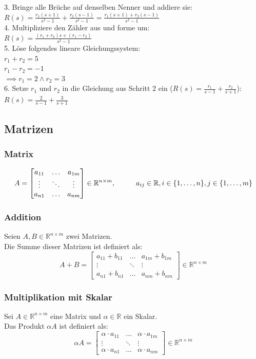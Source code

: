 \documentclass[10pt,a4paper]{article}
\newcommand{\tab}[1][1]{\hspace*{#1cm}}
\begin{document}
3. Bringe alle Brüche auf denselben Nenner und addiere sie: \\
$R(s) = \frac{r_1(s + 1)}{s^2-1} + \frac{r_2(s - 1)}{s^2-1} = \frac{r_1(s + 1) + r_2(s - 1)}{s^2-1}$\\

4. Multipliziere den Zähler aus und forme um: \\
$ R(s) = \frac{(r_1 + r_2)s + (r_1 - r_2)}{s^2-1}$ \\

5. Löse folgendes lineare Gleichungssystem: \\
$r_1 + r_2 = 5$ \\
$r_1 - r_2 = -1$ \\
$\implies r_1 = 2 \land r_2 = 3$ \\

6. Setze $r_1$ und $r_2$ in die Gleichung aus Schritt 2 ein ($R(s) = \frac {r_1} {s - 1} + \frac {r_2} {s + 1}$): \\
$R(s) = \frac {2} {s - 1} + \frac {3} {s + 1}$

\subsection{Matrizen}
\subsubsection{Matrix}
$$
	A = \begin{bmatrix}
		a_{11} & \dots & a_{1m} \\
		\vdots & \ddots & \vdots \\
		a_{n1} & \dots & a_{nm}
	\end{bmatrix} \in \mathbb{R}^{n \times m}, \tab a_{ij} \in \mathbb{R}, i \in \{1, \dots, n\}, j \in \{1, \dots, m\}
$$

\subsubsection{Addition}
Seien $A, B \in \mathbb{R}^{n \times m}$ zwei Matrizen. \\
Die Summe dieser Matrizen ist definiert als:
$$
	A + B = \begin{bmatrix}
	a_{11} + b_{11} & \dots & a_{1m} + b_{1m}\\
	\vdots & \ddots & \vdots \\
	a_{n1} + b_{n1} & \dots & a_{nm} + b_{nm}
	\end{bmatrix} \in \mathbb{R}^{n \times m}
$$

\subsubsection{Multiplikation mit Skalar}
Sei $A \in \mathbb{R}^{n \times m}$ eine Matrix und $\alpha \in \mathbb{R}$ ein Skalar. \\
Das Produkt $\alpha A$ ist definiert als:
$$
\alpha A = \begin{bmatrix}
\alpha ⋅ a_{11} & \dots & \alpha ⋅ a_{1m} \\
\vdots & \ddots & \vdots \\
\alpha ⋅ a_{n1} & \dots & \alpha ⋅ a_{nm}
\end{bmatrix} \in \mathbb{R}^{n \times m}
$$
\end{document}
